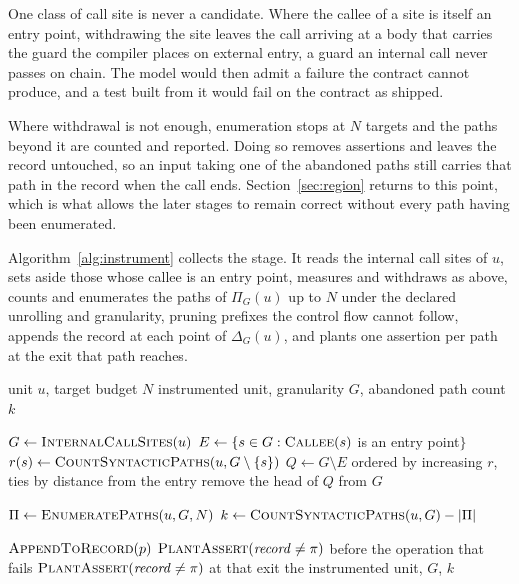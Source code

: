 \documentclass[manuscript,anonymous]{acmart}
\begin{document}
One class of call site is never a candidate. Where the callee of a site is
itself an entry point, withdrawing the site leaves the call arriving at a body
that carries the guard the compiler places on external entry, a guard an
internal call never passes on chain. The model would then admit a failure the
contract cannot produce, and a test built from it would fail on the contract as
shipped.

Where withdrawal is not enough, enumeration stops at $N$ targets and the paths
beyond it are counted and reported. Doing so removes assertions and leaves the
record untouched, so an input taking one of the abandoned paths still carries
that path in the record when the call ends. Section~\ref{sec:region} returns to
this point, which is what allows the later stages to remain correct without
every path having been enumerated.

Algorithm~\ref{alg:instrument} collects the stage. It reads the internal call
sites of $u$, sets aside those whose callee is an entry point, measures and
withdraws as above, counts and enumerates the paths of $\Pi_G(u)$ up to $N$
under the declared unrolling and granularity, pruning prefixes the control flow
cannot follow, appends the record at each point of $\Delta_G(u)$,
and plants one assertion per path at the exit that path reaches.

\begin{algorithm}[!htpb]
\caption{Instrumenting one unit for path enumeration}
\label{alg:instrument}
\begin{algorithmic}[1]
\Require unit $u$, target budget $N$
\Ensure instrumented unit, granularity $G$, abandoned path count $k$

\State $G \gets \textsc{InternalCallSites}(u)$
\State $E \gets \{s \in G : \textsc{Callee}(s)$ is an entry point$\}$
        \State $r(s) \gets \textsc{CountSyntacticPaths}(u, G \setminus \{s\})$
    \EndFor
    \State $Q \gets G \setminus E$ ordered by increasing $r$,
           ties by distance from the entry
        \State remove the head of $Q$ from $G$
    \EndWhile
\EndIf

\State $\Pi \gets \textsc{EnumeratePaths}(u, G, N)$
\State $k \gets \textsc{CountSyntacticPaths}(u, G) - |\Pi|$

    \State $\textsc{AppendToRecord}(p)$
\EndFor
\ForAll{$\pi \in \Pi$}
        \State $\textsc{PlantAssert}(\mathit{record} \neq \pi)$
               before the operation that fails
    \Else
        \State $\textsc{PlantAssert}(\mathit{record} \neq \pi)$ at that exit
    \EndIf
\EndFor
\State \Return the instrumented unit, $G$, $k$
\end{algorithmic}
\end{algorithm}
\end{document}

